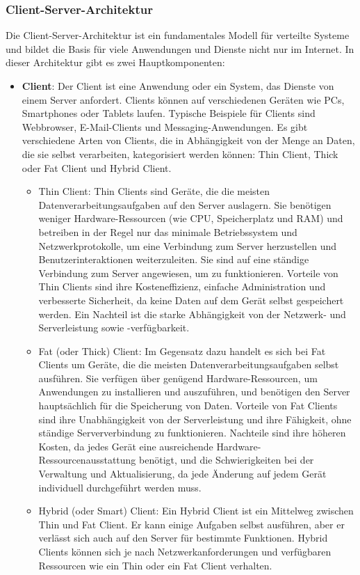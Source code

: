 \documentclass[../vs-script-first-v01.tex]{subfiles}
\begin{document}
\subsubsection{Client-Server-Architektur}
Die Client-Server-Architektur ist ein fundamentales Modell für verteilte Systeme und bildet die Basis für viele Anwendungen und Dienste nicht nur im Internet. In dieser Architektur gibt es zwei Hauptkomponenten:

\begin{itemize}
\item \textbf{Client}: Der Client ist eine Anwendung oder ein System, das Dienste von einem Server anfordert. Clients können auf verschiedenen Geräten wie PCs, Smartphones oder Tablets laufen. Typische Beispiele für Clients sind Webbrowser, E-Mail-Clients und Messaging-Anwendungen.
Es gibt verschiedene Arten von Clients, die in Abhängigkeit von der Menge an Daten, die sie selbst verarbeiten, kategorisiert werden können: Thin Client, Thick oder Fat Client und Hybrid Client.
\begin{itemize}
\item Thin Client: Thin Clients sind Geräte, die die meisten Datenverarbeitungsaufgaben auf den Server auslagern. Sie benötigen weniger Hardware-Ressourcen (wie CPU, Speicherplatz und RAM) und betreiben in der Regel nur das minimale Betriebssystem und Netzwerkprotokolle, um eine Verbindung zum Server herzustellen und Benutzerinteraktionen weiterzuleiten. Sie sind auf eine ständige Verbindung zum Server angewiesen, um zu funktionieren.
Vorteile von Thin Clients sind ihre Kosteneffizienz, einfache Administration und verbesserte Sicherheit, da keine Daten auf dem Gerät selbst gespeichert werden. Ein Nachteil ist die starke Abhängigkeit von der Netzwerk- und Serverleistung sowie -verfügbarkeit.
\item Fat (oder Thick) Client: Im Gegensatz dazu handelt es sich bei Fat Clients um Geräte, die die meisten Datenverarbeitungsaufgaben selbst ausführen. Sie verfügen über genügend Hardware-Ressourcen, um Anwendungen zu installieren und auszuführen, und benötigen den Server hauptsächlich für die Speicherung von Daten.
Vorteile von Fat Clients sind ihre Unabhängigkeit von der Serverleistung und ihre Fähigkeit, ohne ständige Serververbindung zu funktionieren. Nachteile sind ihre höheren Kosten, da jedes Gerät eine ausreichende Hardware-Ressourcenausstattung benötigt, und die Schwierigkeiten bei der Verwaltung und Aktualisierung, da jede Änderung auf jedem Gerät individuell durchgeführt werden muss.
\item Hybrid (oder Smart) Client: Ein Hybrid Client ist ein Mittelweg zwischen Thin und Fat Client. Er kann einige Aufgaben selbst ausführen, aber er verlässt sich auch auf den Server für bestimmte Funktionen. Hybrid Clients können sich je nach Netzwerkanforderungen und verfügbaren Ressourcen wie ein Thin oder ein Fat Client verhalten.

\end{itemize}
\end{itemize}
\end{document}
